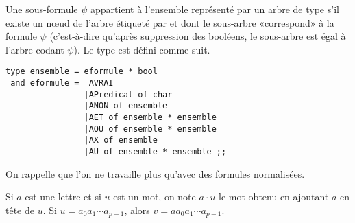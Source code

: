 Une sous-formule $\psi$ appartient à l'ensemble représenté par un arbre de type  s'il existe un nœud de l'arbre étiqueté par  et dont le sous-arbre «correspond» à la formule $\psi$ (c'est-à-dire qu'après suppression des booléens, le sous-arbre est égal à l'arbre codant $\psi$). Le type  est défini comme suit.
\begin{lstlisting}
type ensemble = eformule * bool
 and eformule =  AVRAI
                |APredicat of char
                |ANON of ensemble
                |AET of ensemble * ensemble
                |AOU of ensemble * ensemble
                |AX of ensemble 
                |AU of ensemble * ensemble ;;
\end{lstlisting}

On rappelle que l'on ne travaille plus qu'avec des formules normalisées.

Si $a$ est une lettre et si $u$ est un mot, on note $a\cdot u$ le mot obtenu en ajoutant $a$ en tête de $u$. Si $u = a_0a_1\cdots a_{p-1}$, alors $v =aa_0a_1\cdots a_{p-1}$.

